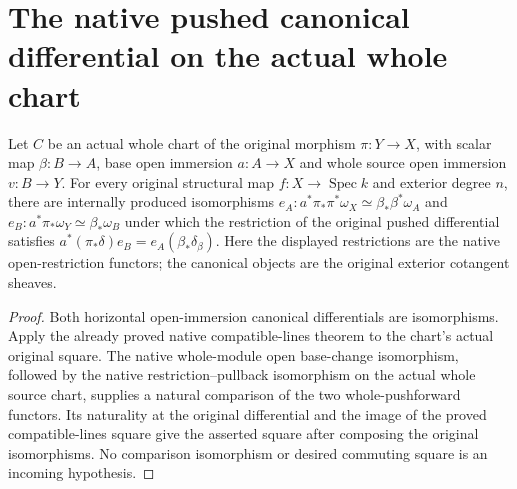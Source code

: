 \section{The native pushed canonical differential on the actual whole chart}

\begin{lemma}
\label{lem:kn-canonical-whole-chart-pushed-differential-square}
\leanok
Let $C$ be an actual whole chart of the original morphism $\pi:Y\to X$,
with scalar map $\beta:B\to A$, base open immersion $a:A\to X$ and
whole source open immersion $v:B\to Y$. For every original structural
map $f:X\to\operatorname{Spec}k$ and exterior degree $n$, there are
internally produced isomorphisms
$e_A:a^*\pi_*\pi^*\omega_X\simeq\beta_*\beta^*\omega_A$ and
$e_B:a^*\pi_*\omega_Y\simeq\beta_*\omega_B$
under which the restriction of the original pushed differential satisfies
$a^*(\pi_*\delta)e_B=e_A(\beta_*\delta_\beta)$.
Here the displayed restrictions are the native open-restriction functors;
the canonical objects are the original exterior cotangent sheaves.
\end{lemma}
\begin{proof}
Both horizontal open-immersion canonical differentials are isomorphisms.
Apply the already proved native compatible-lines theorem to the chart's
actual original square. The native whole-module open base-change
isomorphism, followed by the native restriction--pullback isomorphism
on the actual whole source chart, supplies a natural comparison of the
two whole-pushforward functors. Its naturality at the original differential
and the image of the proved compatible-lines square give the asserted
square after composing the original isomorphisms. No comparison isomorphism
or desired commuting square is an incoming hypothesis.
\end{proof}
